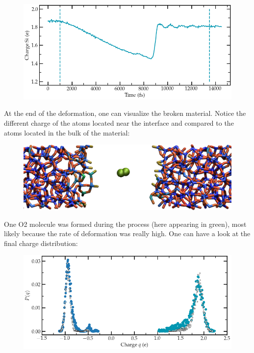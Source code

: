 \begin{figure}
\includegraphics[width=\linewidth]{tutorials/level3/reactive-silicon-dioxide/deformed-charge-light.png}
\end{figure}

At the end of the deformation,  one can visualize the broken material. Notice
the different charge of the atoms located near the interface and compared to the 
atoms located in the bulk of the material:

\begin{figure}
\includegraphics[width=\linewidth]{tutorials/level3/reactive-silicon-dioxide/deformed-light.png}
\end{figure}

One O2 molecule was formed during the process (here appearing in green),
most likely because the rate of deformation was really high.
One can have a look at the final charge distribution:

\begin{figure}
\includegraphics[width=\linewidth]{tutorials/level3/reactive-silicon-dioxide/deformed-distribution-charge-light.png}
\end{figure}

